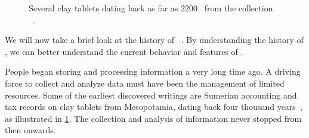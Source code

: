 %
\label{sec:history}%
\FloatBarrier%
%
\begin{figure}%
\centering%
%
%
%
\floatSep%
%
%
%
\floatSep%
%
%
%
\floatSep%
%
%
%
\floatSep%
%
%
%
\caption{Several clay tablets dating back as far as 2200~ from the collection ~\cite{LOCCTFTROGOLTSI}.}%
\label{fig:LOCCTFTROGOLTSI}%
\end{figure}%
%
We will now take a brief look at the history of ~\cite{S2024D:THOD,Q2022ATODHDM,M2024ABHOD,YM2024DDMSD,F2021ABHODM}.
By understanding the history of , we can better understand the current behavior and features of .

People began storing and processing information a very long time ago.
A driving force to collect and analyze data must have been the management of limited resources.
Some of the earliest discovered writings are Sumerian accounting and tax records on clay tablets from Mesopotamia, dating back four thousand years~\cite{LOCCTFTROGOLTSI,T1999CTRAA,KT2021IAITWWICF4Y}, as illustrated in \cref{fig:LOCCTFTROGOLTSI}.
The collection and analysis of information never stopped from then onwards.


